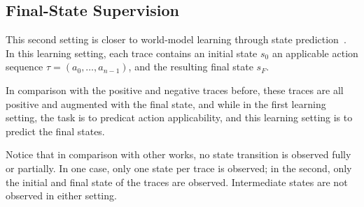 \subsection{Final-State Supervision}

This second setting is closer to world-model learning through state
prediction~\citep{world-models2,xie-etal-2025-making,spies2025transformers}.
In this learning setting, each trace contains an initial state $s_0$ an  applicable action sequence
$\tau=(a_0,\ldots,a_{n-1})$, and the resulting final state $s_F$. 

In comparison with the positive and negative traces before, these traces are all positive
and augmented with the final state, and while in the first learning setting, the task
is to predicat action applicability, and this learning setting is to predict the final states.

Notice that in comparison with other works, no state transition is observed fully or partially.
In one case, only one state per trace is observed; in the second, only the initial and final
state of the traces are observed. Intermediate states are not observed in either setting.


